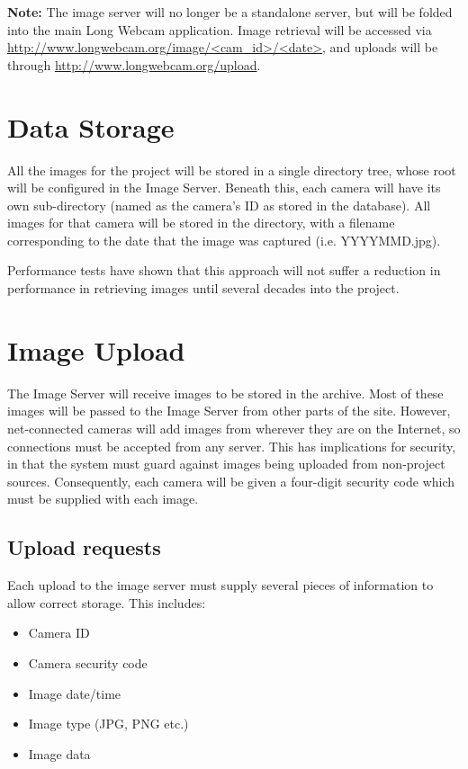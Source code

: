 \documentclass[11pt]{article}
\begin{document}
\textbf{Note:} The image server will no longer be a standalone server, but will be folded into the main Long Webcam application. Image retrieval will be accessed via \url{http://www.longwebcam.org/image/<cam_id>/<date>}, and uploads will be through \url{http://www.longwebcam.org/upload}.

\section{Data Storage}
All the images for the project will be stored in a single directory tree, whose root will be configured in the Image Server. Beneath this, each camera will have its own sub-directory (named as the camera's ID as stored in the database). All images for that camera will be stored in the directory, with a filename corresponding to the date that the image was captured (i.e. YYYYMMD.jpg). 

Performance tests have shown that this approach will not suffer a reduction in performance in retrieving images until several decades into the project.

\section{Image Upload}
The Image Server will receive images to be stored in the archive. Most of these images will be passed to the Image Server from other parts of the site. However, net-connected cameras will add images from wherever they are on the Internet, so connections must be accepted from any server. This has implications for security, in that the system must guard against images being uploaded from non-project sources. Consequently, each camera will be given a four-digit security code which must be supplied with each image.

\subsection{Upload requests}
Each upload to the image server must supply several pieces of information to allow correct storage. This includes:

\begin{itemize}
\item Camera ID
\item Camera security code
\item Image date/time
\item Image type (JPG, PNG etc.)
\item Image data
\end{itemize}
\end{document}
